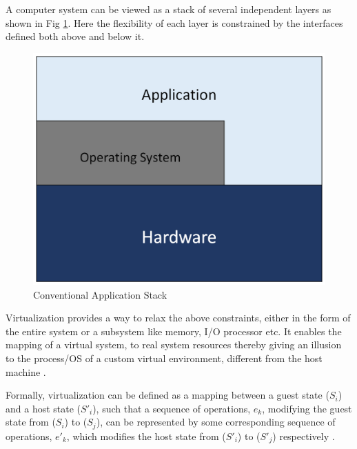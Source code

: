 A computer system can be viewed as a stack of several independent layers as shown in Fig \ref{fig:appstack}. Here the flexibility of each layer is constrained by the interfaces defined both above and below it. 

\setlength{\belowcaptionskip}{-10pt}

\begin{figure}[H]
  \centering
  \includegraphics[scale=0.6]{figures/app_stack.png}
  \caption{Conventional Application Stack}
  \label{fig:appstack}
\end{figure}

Virtualization provides a way to relax the above constraints, either in the form of the entire system or a subsystem like memory, I/O processor etc. It enables the mapping of a virtual system, to real system resources thereby giving an illusion to the process/OS of a custom virtual environment, different from the host machine \cite{virt_arch}.

Formally, virtualization can be defined as a mapping between a guest state ($S_i$) and a host state ($S'_i$), such that a sequence of operations, $e_k$, modifying the guest state from ($S_i$) to ($S_j$), can be represented by some corresponding sequence of operations, $e'_k$, which modifies the host state from ($S'_i$) to ($S'_j$) respectively \cite{smith_nair}. 

\setlength{\belowcaptionskip}{-10pt}

